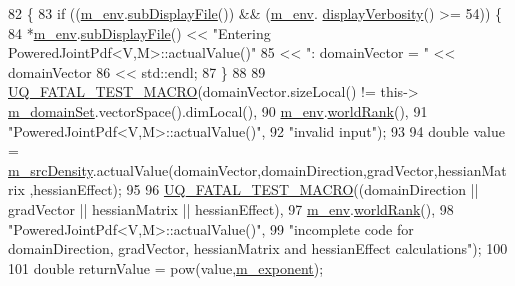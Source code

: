 \begin{DoxyCode}
82 \{
83   \textcolor{keywordflow}{if} ((\hyperlink{class_q_u_e_s_o_1_1_base_scalar_function_adf44141aeb765d97613286f88f235f04}{m\_env}.\hyperlink{class_q_u_e_s_o_1_1_base_environment_a8a0064746ae8dddfece4229b9ad374d6}{subDisplayFile}()) && (\hyperlink{class_q_u_e_s_o_1_1_base_scalar_function_adf44141aeb765d97613286f88f235f04}{m\_env}.
      \hyperlink{class_q_u_e_s_o_1_1_base_environment_a1fe5f244fc0316a0ab3e37463f108b96}{displayVerbosity}() >= 54)) \{
84     *\hyperlink{class_q_u_e_s_o_1_1_base_scalar_function_adf44141aeb765d97613286f88f235f04}{m\_env}.\hyperlink{class_q_u_e_s_o_1_1_base_environment_a8a0064746ae8dddfece4229b9ad374d6}{subDisplayFile}() << \textcolor{stringliteral}{"Entering PoweredJointPdf<V,M>::actualValue()"}
85                             << \textcolor{stringliteral}{": domainVector = "} << domainVector
86                             << std::endl;
87   \}
88 
89   \hyperlink{_defines_8h_a56d63d18d0a6d45757de47fcc06f574d}{UQ\_FATAL\_TEST\_MACRO}(domainVector.sizeLocal() != this->
      \hyperlink{class_q_u_e_s_o_1_1_base_scalar_function_a67696e86211197938c72cd11863f5cf8}{m\_domainSet}.vectorSpace().dimLocal(),
90                       \hyperlink{class_q_u_e_s_o_1_1_base_scalar_function_adf44141aeb765d97613286f88f235f04}{m\_env}.\hyperlink{class_q_u_e_s_o_1_1_base_environment_a78b57112bbd0e6dd0e8afec00b40ffa7}{worldRank}(),
91                       \textcolor{stringliteral}{"PoweredJointPdf<V,M>::actualValue()"},
92                       \textcolor{stringliteral}{"invalid input"});
93 
94   \textcolor{keywordtype}{double} value = \hyperlink{class_q_u_e_s_o_1_1_powered_joint_pdf_a80cd4ecb6f5dc0e1f61d0317ef07a616}{m\_srcDensity}.actualValue(domainVector,domainDirection,gradVector,hessianMatrix
      ,hessianEffect);
95 
96   \hyperlink{_defines_8h_a56d63d18d0a6d45757de47fcc06f574d}{UQ\_FATAL\_TEST\_MACRO}((domainDirection || gradVector || hessianMatrix || hessianEffect),
97                       \hyperlink{class_q_u_e_s_o_1_1_base_scalar_function_adf44141aeb765d97613286f88f235f04}{m\_env}.\hyperlink{class_q_u_e_s_o_1_1_base_environment_a78b57112bbd0e6dd0e8afec00b40ffa7}{worldRank}(),
98                       \textcolor{stringliteral}{"PoweredJointPdf<V,M>::actualValue()"},
99                       \textcolor{stringliteral}{"incomplete code for domainDirection, gradVector, hessianMatrix and hessianEffect
       calculations"});
100 
101   \textcolor{keywordtype}{double} returnValue = pow(value,\hyperlink{class_q_u_e_s_o_1_1_powered_joint_pdf_a867f4a159b1bf2419ef049507306ce79}{m\_exponent});

\end{DoxyCode}
